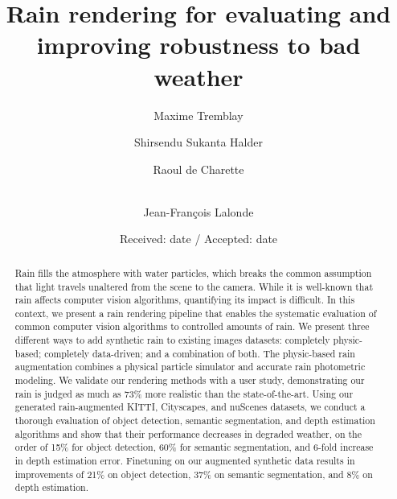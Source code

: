 \documentclass[twocolumn]{svjour3}       %
\begin{document}
\title{Rain rendering for evaluating and improving robustness to bad weather}

\author{
Maxime Tremblay  \and
Shirsendu Sukanta Halder \and
Raoul de Charette \and \\
Jean-François Lalonde
}

\date{Received: date / Accepted: date}

\maketitle

\begin{abstract}
Rain fills the atmosphere with water particles, which breaks the common assumption that light travels unaltered from the scene to the camera. While it is well-known that rain affects computer vision algorithms, quantifying its impact is difficult. In this context, we present a rain rendering pipeline that enables the systematic evaluation of common computer vision algorithms to controlled amounts of rain. We present three different ways to add synthetic rain to existing images datasets: completely physic-based; completely data-driven; and a combination of both. The physic-based rain augmentation combines a physical particle simulator and accurate rain photometric modeling. We validate our rendering methods with a user study, demonstrating our rain is judged as much as 73\% more realistic than the state-of-the-art. Using our generated rain-augmented KITTI, Cityscapes, and nuScenes datasets, we conduct a thorough evaluation of object detection, semantic segmentation, and depth estimation algorithms and show that their performance decreases in degraded weather, on the order of 15\% for object detection, 60\% for semantic segmentation, and 6-fold increase in depth estimation error. Finetuning on our augmented synthetic data results in improvements of 21\% on object detection, 37\% on semantic segmentation, and 8\% on depth estimation. 


\end{abstract}












\end{document}
